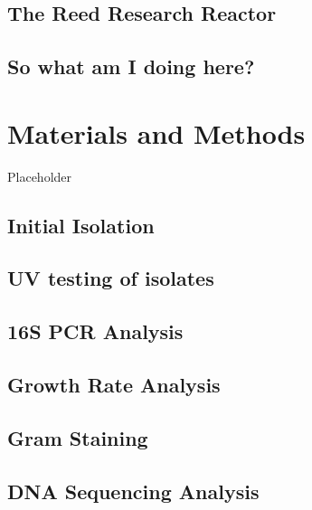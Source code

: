 \documentclass[12pt,twoside]{reedthesis}
\begin{document}
\hypertarget{the-reed-research-reactor}{%
\section{The Reed Research Reactor}\label{the-reed-research-reactor}}

\hypertarget{so-what-am-i-doing-here}{%
\section{So what am I doing here?}\label{so-what-am-i-doing-here}}

\hypertarget{mat-met}{%
\chapter{Materials and Methods}\label{mat-met}}

Placeholder

\hypertarget{initial-isolation}{%
\section{Initial Isolation}\label{initial-isolation}}

\hypertarget{uv-testing-of-isolates}{%
\section{UV testing of isolates}\label{uv-testing-of-isolates}}

\hypertarget{s-pcr-analysis}{%
\section{16S PCR Analysis}\label{s-pcr-analysis}}

\hypertarget{growth-rate-analysis}{%
\section{Growth Rate Analysis}\label{growth-rate-analysis}}

\hypertarget{gram-staining}{%
\section{Gram Staining}\label{gram-staining}}

\hypertarget{dna-sequencing-analysis}{%
\section{DNA Sequencing Analysis}\label{dna-sequencing-analysis}}
\end{document}
